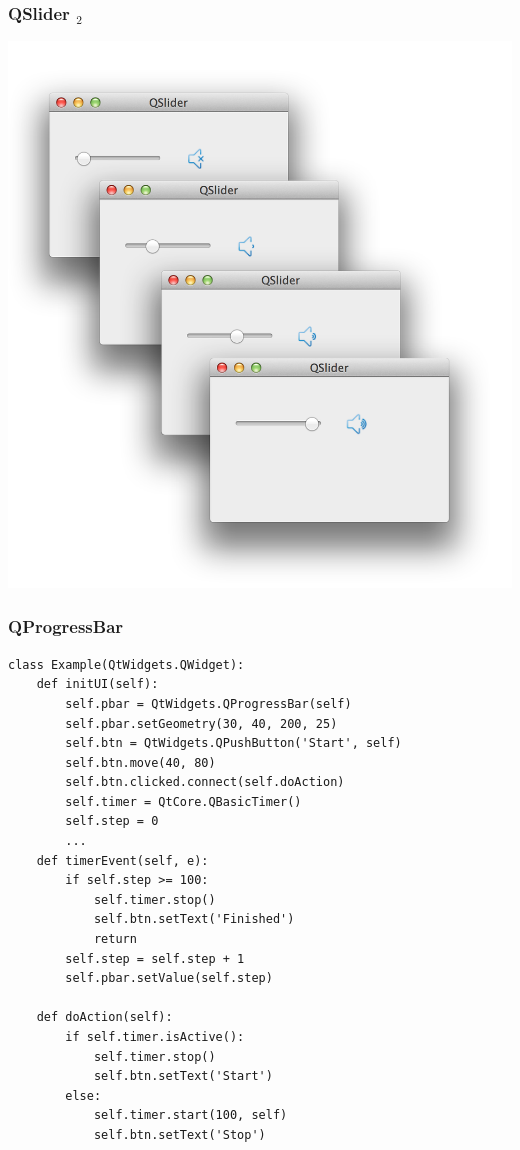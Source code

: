 \documentclass[utf8,compress,aspectratio=169]{beamer}
\begin{document}
\begin{frame}[fragile]
  \frametitle{QSlider $_2$}
\begin{center}
\includegraphics[scale=0.17]{pyqt14.png}
\end{center}
\end{frame}

\begin{frame}
  \frametitle{QProgressBar}
\begin{verbatim}
class Example(QtWidgets.QWidget):
    def initUI(self):
        self.pbar = QtWidgets.QProgressBar(self)
        self.pbar.setGeometry(30, 40, 200, 25)
        self.btn = QtWidgets.QPushButton('Start', self)
        self.btn.move(40, 80)
        self.btn.clicked.connect(self.doAction)
        self.timer = QtCore.QBasicTimer()
        self.step = 0
        ...
    def timerEvent(self, e):
        if self.step >= 100:
            self.timer.stop()
            self.btn.setText('Finished')
            return
        self.step = self.step + 1
        self.pbar.setValue(self.step)

    def doAction(self):
        if self.timer.isActive():
            self.timer.stop()
            self.btn.setText('Start')
        else:
            self.timer.start(100, self)
            self.btn.setText('Stop')
\end{verbatim}
\end{frame}
\end{document}
